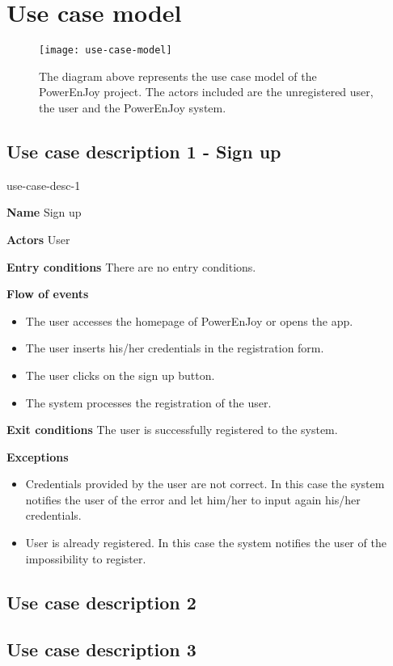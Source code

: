 \section{Use case model}

\begin{figure}[H]
	\centering
	\texttt{[image: use-case-model]}
	\caption[Use case model]{The diagram above represents the use case model of the PowerEnJoy project. The actors included are the unregistered user, the user and the PowerEnJoy system.}
	\label{fig:use-case-model}
\end{figure}

\subsection{Use case description 1 - Sign up}
\begin{labeling}{use-case-desc-1}
		\item[\textbf{Name}] Sign up
		\item[\textbf{Actors}] User
		\item[\textbf{Entry conditions}] There are no entry conditions.
		\item[\textbf{Flow of events}]
			\begin{itemize}
				\item[]
				\item The user accesses the homepage of PowerEnJoy or opens the app.
				\item The user inserts his/her credentials in the registration form.
				\item The user clicks on the sign up button.
				\item The system processes the registration of the user.
			\end{itemize}
		\item[\textbf{Exit conditions}] The user is successfully registered to the system.
		\item[\textbf{Exceptions}]
			\begin{itemize}
				\item[]
				\item Credentials provided by the user are not correct. In this case the system notifies the user of the error and let him/her to input again his/her credentials. 
				\item User is already registered. In this case the system notifies the user of the impossibility to register.
			\end{itemize}
	\end{labeling}

\subsection{Use case description 2}
\subsection{Use case description 3}